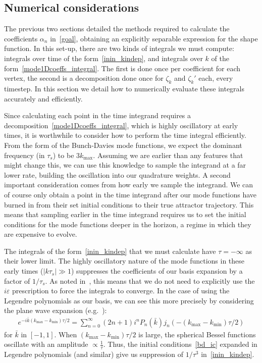 \documentclass[a4paper,12pt]{extarticle}
\newcommand{\kmin}{{k_\text{min}}}
\newcommand{\kmax}{{k_\text{max}}}
\begin{document}
\subsection{Numerical considerations}\label{sec:k_dep}
The previous two sections detailed the methods required to calculate
the coefficients $\alpha_n$ in~\eqref{goal}, obtaining an
explicitly separable expression for the shape function.
In this set-up,
there are two kinds of integrals we must compute: integrals over time of
the form~\eqref{inin_kindep}, and integrals over $k$ of the form~\eqref{mode1Dcoeffs_integral}.
The first is done once per coefficient for each vertex, the second is a decomposition
done once for $\zeta_k$ and $\zeta_k'$ each, every timestep.
In this section we detail how to numerically evaluate these
integrals accurately and efficiently.


Since calculating each point in the time integrand requires a
decomposition~\eqref{mode1Dcoeffs_integral}, which is highly oscillatory
at early times, it is worthwhile to consider how to perform the
time integral efficiently. From the form of the Bunch-Davies mode functions,
we expect the dominant frequency (in $\tau_s$) to be $3\kmax$.
Assuming we are earlier than any features that might change this,
we can use this knowledge to sample the integrand at a far lower rate,
building the oscillation into our quadrature weights.
A second important consideration comes from how early we sample the integrand.
We can of course only obtain a point in the time integrand after our mode
functions have burned in from their set initial conditions to their true
attractor trajectory. This means that sampling earlier in the time integrand
requires us to set the initial conditions for the mode functions deeper
in the horizon, a regime in which they are expensive to evolve.


The integrals of the form~\eqref{inin_kindep} that we must calculate have $\tau=-\infty$ as their lower limit.
The highly oscillatory nature of the mode functions in these early times ($\lvert k\tau_s\rvert\gg1$) suppresses the
coefficients of our basis expansion by a factor of $1/\tau_s$.
As noted in~\cite{Funakoshi}, this means that we do not need to
explicitly use the $i\varepsilon$ prescription to force the integrals to converge.
In the case of using the Legendre polynomials as our
basis, we can see this more precisely by considering
the plane wave expansion (e.g.~\cite{finite_ft_legendre}):
\begin{align}\label{exp_expansion}
    e^{-i\bar{k}(\kmax-\kmin)\tau/2} = \sum_{n=0}^{\infty}(2n+1)i^n P_n(\bar{k})j_n(-(\kmax-\kmin)\tau/2)
\end{align}
for $\bar{k}$ in $[-1,1]$. When $(\kmax-\kmin)\tau/2$ is large, the spherical Bessel functions
oscillate with an amplitude $\propto\frac{1}{\tau}$. Thus,
the initial conditions~\eqref{bd_ic} expanded in Legendre polynomials (and similar)
give us suppression of $1/\tau^3$ in~\eqref{inin_kindep}.
\end{document}
